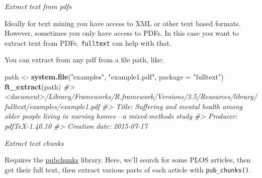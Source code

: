 \documentclass[author-year, review, 11pt]{components/elsarticle} %
\newenvironment{Shaded}{\begin{snugshade}}{\end{snugshade}}
\newcommand{\CommentTok}[1]{\textcolor[rgb]{0.56,0.35,0.01}{\textit{#1}}}
\newcommand{\DataTypeTok}[1]{\textcolor[rgb]{0.13,0.29,0.53}{#1}}
\newcommand{\KeywordTok}[1]{\textcolor[rgb]{0.13,0.29,0.53}{\textbf{#1}}}
\newcommand{\NormalTok}[1]{#1}
\newcommand{\StringTok}[1]{\textcolor[rgb]{0.31,0.60,0.02}{#1}}
\begin{document}
\emph{Extract text from pdfs}

Ideally for text mining you have access to XML or other text based
formats. However, sometimes you only have access to PDFs. In this case
you want to extract text from PDFs. \texttt{fulltext} can help with
that.

You can extract from any pdf from a file path, like:

\begin{Shaded}
\begin{Highlighting}[]
\NormalTok{path <-}\StringTok{ }\KeywordTok{system.file}\NormalTok{(}\StringTok{"examples"}\NormalTok{, }\StringTok{"example1.pdf"}\NormalTok{, }\DataTypeTok{package =} \StringTok{"fulltext"}\NormalTok{)}
\KeywordTok{ft_extract}\NormalTok{(path)}
\CommentTok{#> <document>/Library/Frameworks/R.framework/Versions/3.5/Resources/library/fulltext/examples/example1.pdf}
\CommentTok{#>   Title: Suffering and mental health among older people living in nursing homes---a mixed-methods study}
\CommentTok{#>   Producer: pdfTeX-1.40.10}
\CommentTok{#>   Creation date: 2015-07-17}
\end{Highlighting}
\end{Shaded}

\emph{Extract text chunks}

Requires the \href{https://github.com/ropensci/pubchunks}{pubchunks}
library. Here, we'll search for some PLOS articles, then get their full
text, then extract various parts of each article with
\texttt{pub\_chunks()}.
\end{document}
